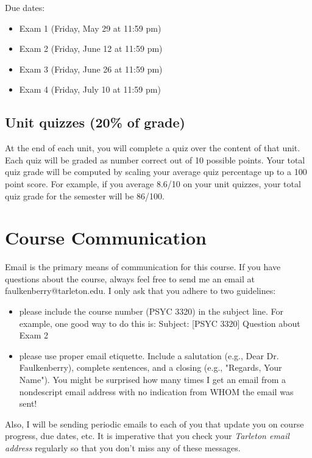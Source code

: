 \documentclass[10pt]{article}
\begin{document}
Due dates:

\begin{itemize}
\item Exam 1 (Friday, May 29 at 11:59 pm)
\item Exam 2 (Friday, June 12 at 11:59 pm)
\item Exam 3 (Friday, June 26 at 11:59 pm)
\item Exam 4 (Friday, July 10 at 11:59 pm)
\end{itemize}

\subsection*{Unit quizzes (20\% of grade)}
\label{sec:org6e9fb3d}
At the end of each unit, you will complete a quiz over the content of that  unit. Each quiz will be graded as number correct out of 10 possible points.  Your total quiz grade will be computed by scaling your average quiz percentage up to a 100 point score.  For example, if you average 8.6/10 on your unit quizzes, your total quiz grade for the semester will be 86/100. 

\section*{Course Communication}
\label{sec:org61f7f9c}

Email is the primary means of communication for this course.  If you have questions about the course, always feel free to send me an email at faulkenberry@tarleton.edu.  I only ask that you adhere to two guidelines:
\begin{itemize}
\item please include the course number (PSYC 3320) in the subject line.  For example, one good way to do this is:  Subject: [PSYC 3320] Question about Exam 2
\item please use proper email etiquette.  Include a salutation (e.g., Dear Dr. Faulkenberry), complete sentences, and a closing (e.g., "Regards, Your Name").  You might be surprised how many times I get an email from a nondescript email address with no indication from WHOM the email was sent!
\end{itemize}

Also, I will be sending periodic emails to each of you that update you on course progress, due dates, etc. It is imperative that you check your \emph{Tarleton email address} regularly so that you don't miss any of these messages.
\end{document}
